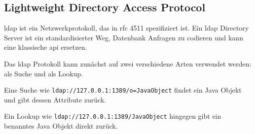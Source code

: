 
\subsection{Lightweight Directory Access Protocol}\label{subsec:ldap}
\gls{ldap} ist ein Netzwerkprotokoll, das in \gls{rfc} 4511 spezifiziert ist.
Ein \gls{ldap} Directory Server ist ein standardisierter Weg, Datenbank Anfragen zu codieren und kann eine klassische \gls{api} ersetzen.

Das \gls{ldap} Protokoll kann zunächst auf zwei verschiedene Arten verwendet werden: als Suche und als Lookup.

Eine Suche wie \verb|ldap://127.0.0.1:1389/o=JavaObject| findet ein Java Objekt und gibt dessen Attribute zurück.

Ein Lookup wie \verb|ldap://127.0.0.1:1389/JavaObject| hingegen gibt ein benanntes Java Objekt direkt zurück.
